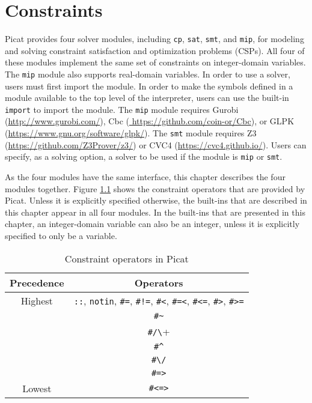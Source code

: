 \chapter{\label{ch:constraints}Constraints}
Picat provides four solver modules, including \texttt{cp}, \texttt{sat}, \texttt{smt}, and \texttt{mip}, for modeling and solving constraint satisfaction and optimization problems (CSPs).  All four of these modules implement the same set of constraints on integer-domain variables. The \texttt{mip} module also supports real-domain variables. In order to use a solver, users must first import the module. In order to make the symbols defined in a module available to the top level of the interpreter, users can use the built-in {\tt import} to import the module. The \texttt{mip} module requires Gurobi (\url{http://www.gurobi.com/}), Cbc (\url{ https://github.com/coin-or/Cbc}), or GLPK (\url{https://www.gnu.org/software/glpk/}). The \texttt{smt} module requires Z3 (\url{https://github.com/Z3Prover/z3/}) or CVC4 (\url{https://cvc4.github.io/}). Users can specify, as a solving option, a solver to be used if the module is \texttt{mip} or \texttt{smt}.

As the four modules have the same interface, this chapter describes the four modules together. Figure \ref{tab:cons_ops} shows the constraint operators that are provided by Picat. Unless it is explicitly specified otherwise, the built-ins that are described in this chapter appear in all four modules. In the built-ins that are presented in this chapter, an integer-domain variable can also be an integer, unless it is explicitly specified to only be a variable.

\begin{table}[ht]
\caption{\label{tab:cons_ops}Constraint operators in Picat}
\begin{center}
\begin{tabular}{ |c|c| } \hline
Precedence & Operators  \\ \hline \hline
Highest    & \verb+::+, \verb+notin+,  \verb+#=+,  \verb+#!=+, \verb+#<+,  \verb+#=<+, \verb+#<=+, \verb+#>+, \verb+#>=+ \\ \hline 
           & \verb+#~+ \\ \hline 
           & \verb+#/\+ \\ \hline 
           & \verb+#^+ \\ \hline 
           & \verb+#\/+ \\ \hline 
           & \verb+#=>+ \\ \hline 
Lowest     & \verb+#<=>+ \\ \hline 
\end{tabular}
\end{center}
\end{table}

